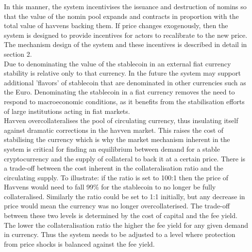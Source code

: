 \noindent In this manner, the system incentivises the issuance and destruction of nomins so that the value of the nomin pool expands and contracts in proportion with the total value of havvens backing them. If price changes exogenously, then the system is designed to provide incentives for actors to recalibrate to the new price. The mechanism design of the system and these incentives is described in detail in section 2. \\

\noindent Due to denominating the value of the stablecoin in an external fiat currency stability is relative only to that currency. In the future the system may support additional 'flavors' of stablecoin that are denominated in other currencies such as the Euro. Denominating the stablecoin in a fiat currency removes the need to respond to macroeconomic conditions, as it benefits from the stabilisation efforts of large institutions acting in fiat markets. \\

\noindent Havven overcollateralises the pool of circulating currency, thus insulating itself against dramatic corrections in the havven market. This raises the cost of stabilising the currency which is why the market mechanism inherent in the system is critical for finding an equilibrium between demand for a stable cryptocurrency and the supply of collateral to back it at a certain price. There is a trade-off between the cost inherent in the collateralisation ratio and the circulating supply. To illustrate: if the ratio is set to 100:1 then the price of Havvens would need to fall 99\% for the stablecoin to no longer be fully collateralised. Similarly the ratio could be set to 1:1 initially, but any decrease in price would mean the currency was no longer overcollaterised. The trade-off between these two levels is determined by the cost of capital and the fee yield. The lower the collateralisation ratio the higher the fee yield for any given demand in currency. Thus the system needs to be adjusted to a level where protection from price shocks is balanced against the fee yield. \\

\pagebreak
